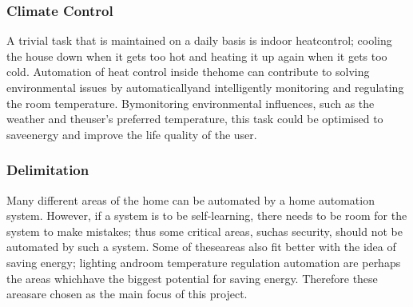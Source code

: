 
\subsubsection{Climate Control}
\label{sub:Clitemate Control}
A trivial task that is maintained on a daily basis is indoor heatcontrol; cooling the house down when it gets too hot and heating it up again when it gets too cold. Automation of heat control inside thehome can contribute to solving environmental issues by automaticallyand intelligently monitoring and regulating the room temperature. Bymonitoring environmental influences, such as the weather and theuser's preferred temperature, this task could be optimised to saveenergy and improve the life quality of the user.

\subsubsection{Delimitation}
Many different areas of the home can be automated by a home automation system. However, if a system is to be self-learning, there needs to be room for the system to make mistakes; thus some critical areas, suchas security, should not be automated by such a system. Some of theseareas also fit better with the idea of saving energy; lighting androom temperature regulation automation are perhaps the areas whichhave the biggest potential for saving energy. Therefore these areasare chosen as the main focus of this project.
